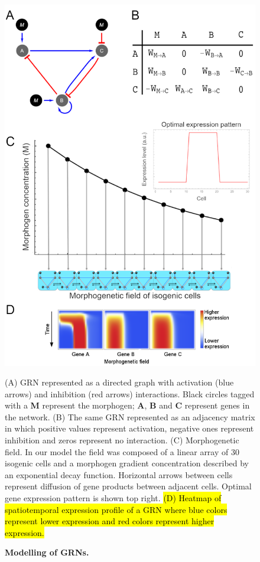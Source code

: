 \documentclass[10pt,letterpaper]{article}
\newcommand{\hil}[1]{\hl{#1}} %
\begin{document}
\begin{figure}[!h]
 \includegraphics[width=\textwidth]{figures/metodos/Fig1}
    \caption{\bf Modelling of GRNs.}
    (A) GRN represented as a directed graph with activation (blue arrows) and
    inhibition (red arrows) interactions. Black circles
    tagged with a \textbf{M} represent the morphogen; \textbf{A}, \textbf{B} and
    \textbf{C} represent genes in the network.
    (B) The same GRN represented as an adjacency matrix in which positive values
    represent activation, negative ones represent inhibition and
    zeros represent no interaction.
    (C) Morphogenetic field. In our model the field was composed of a linear
    array of 30 isogenic cells and a morphogen gradient concentration described
    by an exponential decay function. Horizontal arrows between cells represent
    diffusion of gene products between adjacent cells. Optimal gene expression
    pattern is shown top right.
    \hil{(D) Heatmap of spatiotemporal expression profile of a GRN where blue
    colors represent lower expression and red colors represent higher
    expression.}
 \label{fig:model}
\end{figure}
\end{document}
